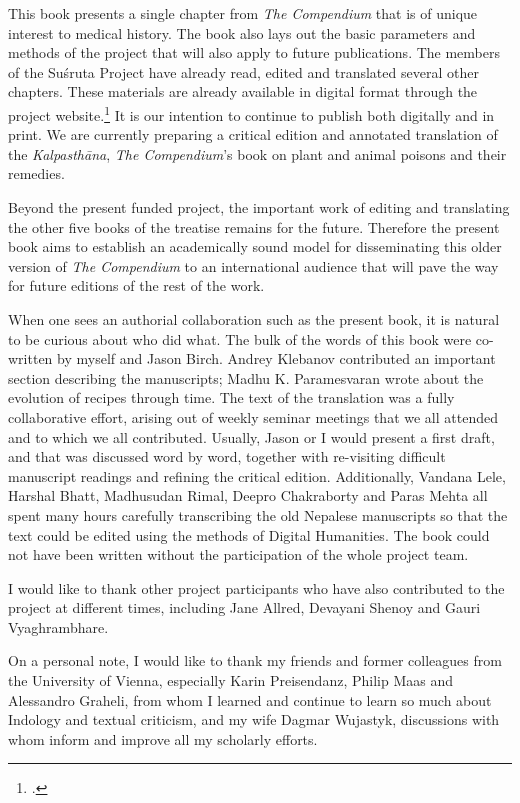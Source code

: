 This book presents a single chapter from \emph{The Compendium} that is of
unique interest to medical history.  The book also lays out the basic
parameters and methods of the project that will also apply to future
publications. The members of the Suśruta Project have already read, edited and
translated several other chapters.  These materials are already available in
digital format through the project website.\footcite{wuja-2021b} It is our
intention to continue to publish both digitally and in print.  We are
currently preparing a critical edition and annotated translation of the
\emph{Kalpasthāna}, \emph{The Compendium}'s book on plant and animal poisons
and their remedies.

Beyond the present funded project, the important work of editing and
translating the other five books of the treatise remains for the future.
Therefore the present book aims to establish an academically sound model for
disseminating this older version of \emph{The Compendium} to an international
audience that will pave the way for future editions of the rest of the work.

When one sees an authorial collaboration such as the present book, it is
natural to be curious about who did what.  The bulk of the words of this
book were co-written by myself and Jason Birch.  Andrey Klebanov contributed
an important section describing the manuscripts; Madhu K. Paramesvaran wrote
about the evolution of recipes through time. The text of the translation was
a fully collaborative effort, arising out of weekly seminar meetings that we
all attended and to which we all contributed. Usually, Jason or I would
present a first draft, and that was discussed word by word, together with
re-visiting difficult manuscript readings and refining the critical edition.
Additionally, Vandana Lele, Harshal Bhatt, Madhusudan Rimal, Deepro
Chakraborty and Paras Mehta all spent many hours carefully transcribing the
old Nepalese manuscripts so that the text could be edited using the methods
of Digital Humanities.  The book could not have been written without the
participation of the whole project team.

I would like to thank other project participants who have also contributed to
the project at different times, including Jane Allred, Devayani Shenoy and
Gauri Vyaghrambhare.  

On a personal note, I would like to thank my friends and former colleagues 
from the University of Vienna, especially Karin Preisendanz, Philip Maas and
Alessandro Graheli, from whom I learned and continue to learn so much about
Indology and textual criticism, and my wife Dagmar Wujastyk, discussions with
whom inform and improve all my scholarly efforts.

